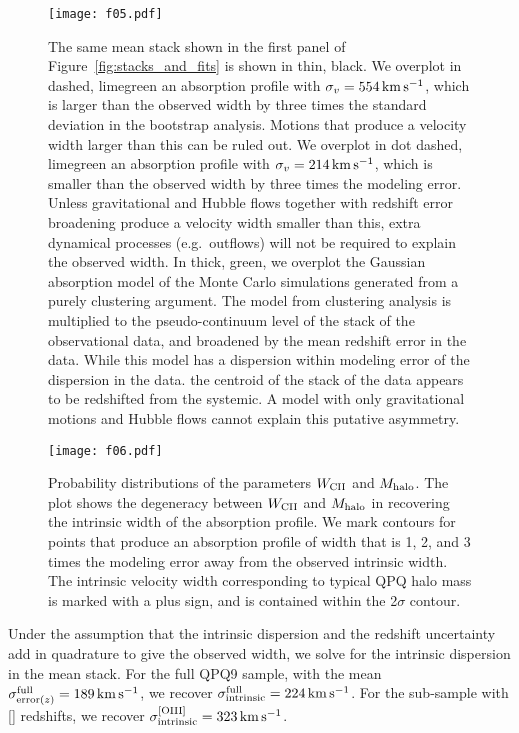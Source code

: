 \documentclass[iop]{emulateapj}
\begin{document}
\begin{figure}
\texttt{[image: f05.pdf]}
\caption{The same  mean stack shown in the first panel of
Figure~\ref{fig:stacks_and_fits} is shown in thin, black.
We overplot in dashed, limegreen an
absorption profile with $\sigma_v=554\,{\rm km\,s^{-1}}$, which is larger than the observed width
by three times the standard deviation in the bootstrap analysis. Motions that produce a velocity
width larger than this can be ruled out. We overplot in dot dashed, limegreen an absorption profile with
$\sigma_v=214\,{\rm km\,s^{-1}}$, which is smaller than the observed width by three times the
modeling error. Unless gravitational and Hubble flows together with redshift error broadening
produce a velocity width smaller than this, extra dynamical processes (e.g.\ outflows) will not be
required to explain the observed width.
In thick, green, we overplot the
Gaussian absorption model of the Monte Carlo simulations generated from a purely clustering
argument. The model from clustering analysis is multiplied to the pseudo-continuum level of the
stack of the observational data, and broadened
by the mean redshift error in the data. While this model has a dispersion within modeling error of the
dispersion in the data. the centroid of the stack of the data appears to be redshifted
from the systemic. A model with only gravitational motions and Hubble flows cannot explain
this putative asymmetry.
}
\label{fig:monte}
\end{figure}

\begin{figure}
\texttt{[image: f06.pdf]}
\caption{
Probability distributions of the parameters $W_{\rm CII}$ and $M_{\rm halo}$. The plot shows the
degeneracy between $W_{\rm CII}$ and $M_{\rm halo}$ in recovering the intrinsic width of the
absorption profile. We mark contours for points that produce an absorption
profile of width that is 1, 2, and 3 times the modeling error away from the observed intrinsic
width. The intrinsic velocity width corresponding to typical QPQ halo mass is marked with a plus
sign, and is contained within the 2$\sigma$ contour.}
\label{fig:contour}
\end{figure}

Under the assumption that the intrinsic dispersion and the redshift uncertainty add in
quadrature to give the observed width, we solve for the intrinsic dispersion in the 
mean stack. For the full QPQ9 sample, with the mean
$\sigma_{{\rm error}(z)}^{\rm full}=189\,{\rm km\,s^{-1}}$, we recover
$\sigma_{\rm intrinsic}^{\rm full}=224\,{\rm km\,s^{-1}}$. For the sub-sample with []
redshifts, we recover $\sigma_{\rm intrinsic}^{\rm [OIII]}=323\,{\rm km\,s^{-1}}$.
\end{document}
